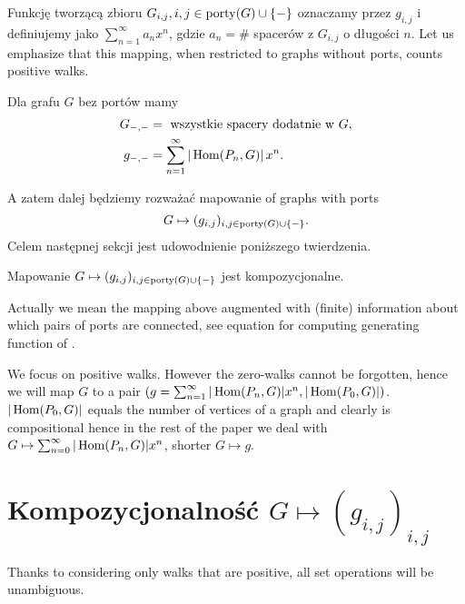 \begin{df}
Funkcję tworzącą zbioru $G_{i,j}, i,j \in \operatorname{porty}(G) \cup \{ - \}$ oznaczamy przez $g_{i,j}$ i definiujemy jako $\sum_{n=1}^{\infty} a_n x^n$, gdzie $a_n = \#$ spacerów z $G_{i,j}$ o długości $n$. 
Let us emphasize that this mapping, when restricted to graphs without ports, counts positive walks.
\begin{obs}
	Dla grafu $G$ bez portów mamy 
	\begin{align*}
	G_{-, -} & = \text{ wszystkie spacery dodatnie w $G$},\\
	g_{-, -} & = \sum_{n=1}^{\infty}| \operatorname{Hom}(P_n, G) |\ \! x^n.
	\end{align*}
\end{obs}
A zatem dalej będziemy rozważać mapowanie of graphs with ports
	\begin{equation}
		G \mapsto (g_{i, j})_{i, j \in \operatorname{porty}(G) \cup \{ - \}}.
	\end{equation}
Celem następnej sekcji jest udowodnienie poniższego twierdzenia.
\begin{tw}
	Mapowanie $G \mapsto (g_{i,j})_{i, j \in \operatorname{porty}(G) \cup \{ - \}}$ jest kompozycjonalne. 
\end{tw}
\begin{uw}
	Actually we mean the mapping above augmented with (finite) information about which pairs of ports are connected, see equation for computing generating function of \join.
\end{uw}
\begin{uw}
	We focus on positive walks. However the zero-walks cannot be forgotten, hence we will map $G$ to a pair $(g = \sum_{n = 1} ^ {\infty} |\operatorname{Hom}(P_n, G)| x^n, |\operatorname{Hom}(P_0, G)|)$. $|\operatorname{Hom}(P_0, G)|$ equals the number of vertices of a graph and clearly is compositional hence in the rest of the paper we deal with $G \mapsto \sum_{n = 0} ^ {\infty} |\operatorname{Hom}(P_n, G)| x^n$, shorter $G \mapsto g$.
\end{uw}
\section{Kompozycjonalność $G \mapsto (g_{i,j})_{i,j}$}
Thanks to considering only walks that are positive, all set operations will be unambiguous.

\end{df}
